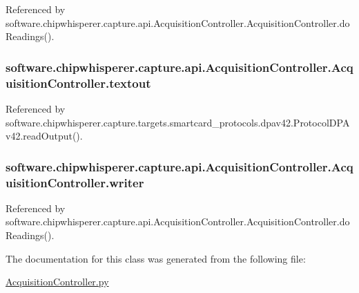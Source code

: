 Referenced by software.\+chipwhisperer.\+capture.\+api.\+Acquisition\+Controller.\+Acquisition\+Controller.\+do\+Readings().

\hypertarget{classsoftware_1_1chipwhisperer_1_1capture_1_1api_1_1AcquisitionController_1_1AcquisitionController_a5178809708c02fd382321c88f2d37632}{}
\subsubsection[{textout}]{\setlength{\rightskip}{0pt plus 5cm}software.\+chipwhisperer.\+capture.\+api.\+Acquisition\+Controller.\+Acquisition\+Controller.\+textout}\label{classsoftware_1_1chipwhisperer_1_1capture_1_1api_1_1AcquisitionController_1_1AcquisitionController_a5178809708c02fd382321c88f2d37632}


Referenced by software.\+chipwhisperer.\+capture.\+targets.\+smartcard\+\_\+protocols.\+dpav42.\+Protocol\+D\+P\+Av42.\+read\+Output().

\hypertarget{classsoftware_1_1chipwhisperer_1_1capture_1_1api_1_1AcquisitionController_1_1AcquisitionController_a392a95c053134b56d5d4e57e6c9bd09d}{}
\subsubsection[{writer}]{\setlength{\rightskip}{0pt plus 5cm}software.\+chipwhisperer.\+capture.\+api.\+Acquisition\+Controller.\+Acquisition\+Controller.\+writer}\label{classsoftware_1_1chipwhisperer_1_1capture_1_1api_1_1AcquisitionController_1_1AcquisitionController_a392a95c053134b56d5d4e57e6c9bd09d}


Referenced by software.\+chipwhisperer.\+capture.\+api.\+Acquisition\+Controller.\+Acquisition\+Controller.\+do\+Readings().



The documentation for this class was generated from the following file\+:\begin{DoxyCompactItemize}
\item 
\hyperlink{AcquisitionController_8py}{Acquisition\+Controller.\+py}\end{DoxyCompactItemize}
